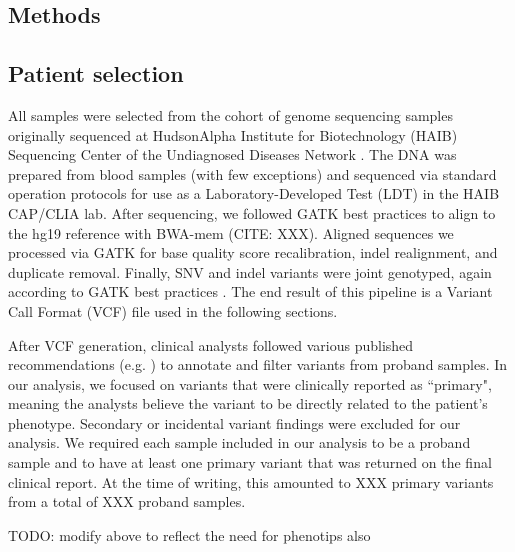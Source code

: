 \documentclass{bioinfo}
\begin{document}
\begin{methods}
\section{Methods}
\subsection{Patient selection}
All samples were selected from the cohort of genome sequencing samples originally sequenced at HudsonAlpha Institute for Biotechnology (HAIB) Sequencing Center of the Undiagnosed Diseases Network \citep{ramoni2017}.  The DNA was prepared from blood samples (with few exceptions) and sequenced via standard operation protocols for use as a Laboratory-Developed Test (LDT) in the HAIB CAP/CLIA lab.  After sequencing, we followed GATK best practices \citep{depristo2011} to align to the hg19 reference with BWA-mem (CITE: XXX).  Aligned sequences we processed via GATK for base quality score recalibration, indel realignment, and duplicate removal.  Finally, SNV and indel variants were joint genotyped, again according to GATK best practices \citep{depristo2011}.  The end result of this pipeline is a Variant Call Format (VCF) file used in the following sections.

After VCF generation, clinical analysts followed various published recommendations (e.g. \citealp{worthey2017, roy2018}) to annotate and filter variants from proband samples.  
In our analysis, we focused on variants that were clinically reported as ``primary", meaning the analysts believe the variant to be directly related to the patient's phenotype.  Secondary or incidental variant findings were excluded for our analysis.  We required each sample included in our analysis to be a proband sample and to have at least one primary variant that was returned on the final clinical report.  At the time of writing, this amounted to XXX primary variants from a total of XXX proband samples.

TODO: modify above to reflect the need for phenotips also


\end{methods}
\end{document}
